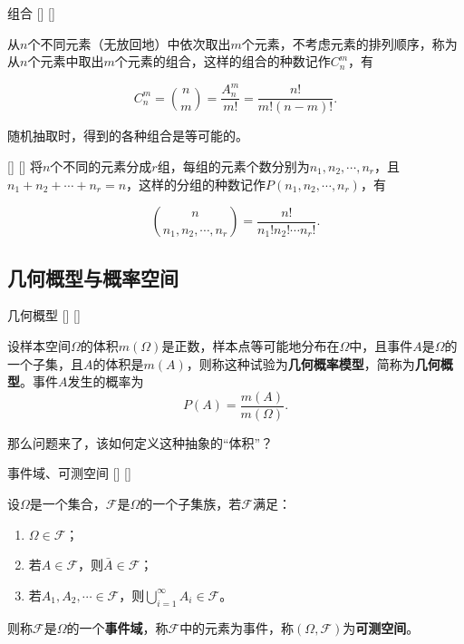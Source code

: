\documentclass[UTF8]{ctexart}
\begin{document}
        \begin{xmp}
            []
            {组合}
            []
            []


            从$n$个不同元素（无放回地）中依次取出$m$个元素，不考虑元素的排列顺序，称为从$n$个元素中取出$m$个元素的组合，这样的组合的种数记作$C_n^m$，有
            
            \[C_n^m=\binom{n}{m}=\frac{A_n^m}{m!}=\frac{n!}{m!(n-m)!}.\]
            
            随机抽取时，得到的各种组合是等可能的。
        \end{xmp}

        \begin{xmp}
            []
            {}
            []
            []
            将$n$个不同的元素分成$r$组，每组的元素个数分别为$n_1,n_2,\cdots,n_r$，且$n_1+n_2+\cdots+n_r=n$，这样的分组的种数记作$P(n_1,n_2,\cdots,n_r)$，有
            
            \[\binom{n}{n_1,n_2,\cdots,n_r}=\frac{n!}{n_1!n_2!\cdots n_r!}.\]
        \end{xmp}
    
    \subsection{几何概型与概率空间}
        
        \begin{dfn}
            []
            {几何概型}
            []
            []


            设样本空间$\Omega$的体积$m(\Omega)$是正数，样本点等可能地分布在$\Omega$中，且事件$A$是$\Omega$的一个子集，且$A$的体积是$m(A)$，则称这种试验为\textbf{几何概率模型}，简称为\textbf{几何概型}。事件$A$发生的概率为\[P(A)=\frac{m(A)}{m(\Omega)}.\]
        \end{dfn}

        那么问题来了，该如何定义这种抽象的“体积”？

        \begin{dfn}
            []
            {事件域、可测空间}
            []
            []


            设$\Omega$是一个集合，$\mathcal{F}$是$\Omega$的一个子集族，若$\mathcal{F}$满足：

            \begin{enumerate}
                \item $\Omega\in\mathcal{F}$；
                \item 若$A\in\mathcal{F}$，则$\bar{A}\in\mathcal{F}$；
                \item 若$A_1,A_2,\cdots\in\mathcal{F}$，则$\bigcup_{i=1}^{\infty}A_i\in\mathcal{F}$。
            \end{enumerate}

            则称$\mathcal{F}$是$\Omega$的一个\textbf{事件域}，称$\mathcal{F}$中的元素为事件，称$(\Omega,\mathcal{F})$为\textbf{可测空间}。

        \end{dfn}
\end{document}
